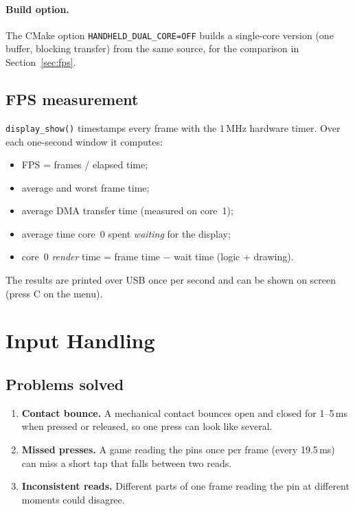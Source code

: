 \documentclass[11pt,a4paper]{article}
\newcommand{\unit}[2]{\ensuremath{#1\,\mathrm{#2}}}
\begin{document}
\paragraph{Build option.} The CMake option \texttt{HANDHELD\_DUAL\_CORE=OFF}
builds a single-core version (one buffer, blocking transfer) from the same
source, for the comparison in Section~\ref{sec:fps}.

\subsection{FPS measurement}\label{sec:fpsmethod}
\texttt{display\_show()} timestamps every frame with the \unit{1}{MHz} hardware
timer. Over each one-second window it computes:
\begin{itemize}
  \item FPS = frames / elapsed time;
  \item average and worst frame time;
  \item average DMA transfer time (measured on core~1);
  \item average time core~0 spent \emph{waiting} for the display;
  \item core~0 \emph{render} time = frame time $-$ wait time (logic + drawing).
\end{itemize}
The results are printed over USB once per second and can be shown on screen
(press C on the menu).

\section{Input Handling}\label{sec:input}

\subsection{Problems solved}
\begin{enumerate}
  \item \textbf{Contact bounce.} A mechanical contact bounces open and closed for
        1--5\,ms when pressed or released, so one press can look like several.
  \item \textbf{Missed presses.} A game reading the pins once per frame
        (every 19.5\,ms) can miss a short tap that falls between two reads.
  \item \textbf{Inconsistent reads.} Different parts of one frame reading the pin
        at different moments could disagree.
\end{enumerate}
\end{document}
